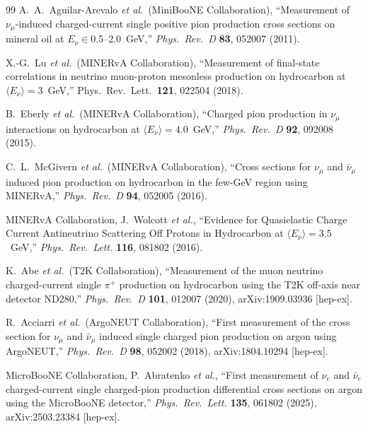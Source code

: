 \begin{thebibliography}{99}
  A.~A.~Aguilar-Arevalo \textit{et al.}\ (MiniBooNE Collaboration),
  ``Measurement of $\nu_\mu$-induced charged-current single positive pion
  production cross sections on mineral oil at $E_\nu \in 0.5$--$2.0$~GeV,''
  \textit{Phys.\ Rev.\ D} \textbf{83}, 052007 (2011).

  X.-G.~Lu \textit{et al.}\ (MINERvA Collaboration),
  ``Measurement of final-state correlations in neutrino muon-proton mesonless
  production on hydrocarbon at $\langle E_\nu\rangle=3$~GeV,''
  Phys.\ Rev.\ Lett.\ \textbf{121}, 022504 (2018).

  B.~Eberly \textit{et al.}\ (MINERvA Collaboration),
  ``Charged pion production in $\nu_\mu$ interactions on hydrocarbon at
  $\langle E_\nu \rangle = 4.0$~GeV,''
  \textit{Phys.\ Rev.\ D} \textbf{92}, 092008 (2015).

  C.~L.~McGivern \textit{et al.}\ (MINERvA Collaboration),
  ``Cross sections for $\nu_\mu$ and $\bar{\nu}_\mu$ induced pion production on
  hydrocarbon in the few-GeV region using MINERvA,''
  \textit{Phys.\ Rev.\ D} \textbf{94}, 052005 (2016).

  MINERvA Collaboration, J.~Wolcott \textit{et al.},
  ``Evidence for Quasielastic Charge Current Antineutrino Scattering Off
  Protons in Hydrocarbon at $\langle E_{\bar\nu} \rangle = 3.5$~GeV,''
  \textit{Phys.\ Rev.\ Lett.} \textbf{116}, 081802 (2016).

  K.~Abe \textit{et al.}\ (T2K Collaboration),
  ``Measurement of the muon neutrino charged-current single $\pi^+$ production
  on hydrocarbon using the T2K off-axis near detector ND280,''
  \textit{Phys.\ Rev.\ D} \textbf{101}, 012007 (2020), arXiv:1909.03936 [hep-ex].

  R.~Acciarri \textit{et al.}\ (ArgoNEUT Collaboration),
  ``First measurement of the cross section for $\nu_\mu$ and $\bar{\nu}_\mu$
  induced single charged pion production on argon using ArgoNEUT,''
  \textit{Phys.\ Rev.\ D} \textbf{98}, 052002 (2018), arXiv:1804.10294 [hep-ex].

  MicroBooNE Collaboration, P.~Abratenko \textit{et al.},
  ``First measurement of $\nu_e$ and $\bar{\nu}_e$ charged-current single
  charged-pion production differential cross sections on argon using the
  MicroBooNE detector,''
  \textit{Phys.\ Rev.\ Lett.} \textbf{135}, 061802 (2025),
  arXiv:2503.23384 [hep-ex].


\end{thebibliography}
